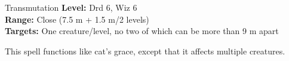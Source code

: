 {Transmutation}
{
	\textbf{Level:}
	Drd 6, Wiz 6\\
	\textbf{Range:}
	Close (7.5 m + 1.5 m/2 levels)\\
	\textbf{Targets:}
	One creature/level, no two of which can be more than 9 m apart\\
}
{
	This spell functions like cat's grace, except that it affects multiple creatures.

}
